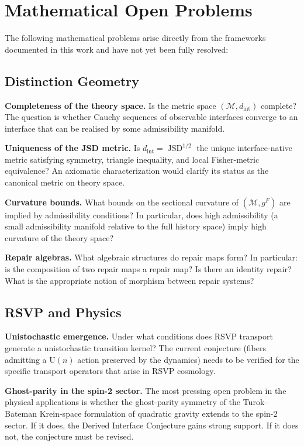 \documentclass[12pt,a4paper]{book}
\theoremstyle{remark}
\theoremstyle{definition}
\begin{document}
\section{Mathematical Open Problems}

The following mathematical problems arise directly from the frameworks
documented in this work and have not yet been fully resolved:

\subsection*{Distinction Geometry}

\textbf{Completeness of the theory space.} Is the metric space
$(\mathcal{M}, d_{\mathrm{int}})$ complete? The question is whether
Cauchy sequences of observable interfaces converge to an interface that
can be realised by some admissibility manifold.

\textbf{Uniqueness of the JSD metric.} Is $d_{\mathrm{int}} = \operatorname{JSD}^{1/2}$
the unique interface-native metric satisfying symmetry, triangle inequality,
and local Fisher-metric equivalence? An axiomatic characterization would
clarify its status as the canonical metric on theory space.

\textbf{Curvature bounds.} What bounds on the sectional curvature of
$(\mathcal{M}, g^F)$ are implied by admissibility conditions? In
particular, does high admissibility (a small admissibility manifold
relative to the full history space) imply high curvature of the theory
space?

\textbf{Repair algebras.} What algebraic structures do repair maps
form? In particular: is the composition of two repair maps a repair
map? Is there an identity repair? What is the appropriate notion of
morphism between repair systems?

\subsection*{RSVP and Physics}

\textbf{Unistochastic emergence.} Under what conditions does RSVP
transport generate a unistochastic transition kernel? The current
conjecture (fibers admitting a $\mathrm{U}(n)$ action preserved by the
dynamics) needs to be verified for the specific transport operators
that arise in RSVP cosmology.

\textbf{Ghost-parity in the spin-2 sector.} The most pressing open
problem in the physical applications is whether the ghost-parity symmetry
of the Turok--Bateman Krein-space formulation of quadratic gravity extends
to the spin-2 sector. If it does, the Derived Interface Conjecture gains
strong support. If it does not, the conjecture must be revised.
\end{document}
